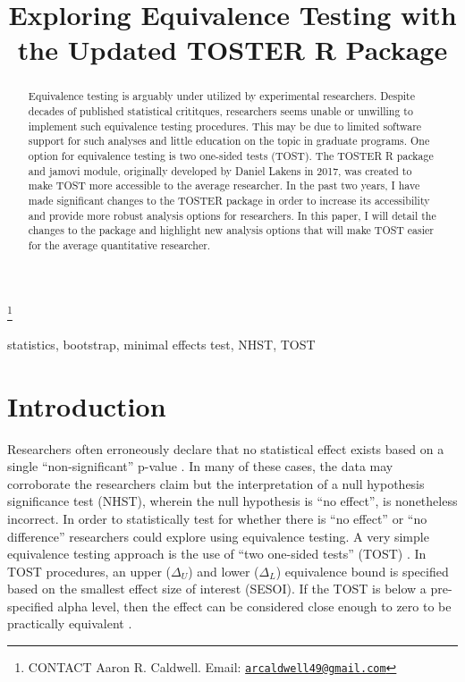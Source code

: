 \documentclass[]{interact}
\theoremstyle{plain}%
\theoremstyle{definition}
\theoremstyle{remark}
\begin{document}

\title{Exploring Equivalence Testing with the Updated TOSTER R Package}


\author{
}

\thanks{CONTACT Aaron R.
Caldwell. Email: \href{mailto:arcaldwell49@gmail.com}{\nolinkurl{arcaldwell49@gmail.com}}}

\maketitle

\begin{abstract}
Equivalence testing is arguably under utilized by experimental
researchers. Despite decades of published statistical crititques,
researchers seems unable or unwilling to implement such equivalence
testing procedures. This may be due to limited software support for such
analyses and little education on the topic in graduate programs. One
option for equivalence testing is two one-sided tests (TOST). The TOSTER
R package and jamovi module, originally developed by Daniel Lakens in
2017, was created to make TOST more accessible to the average
researcher. In the past two years, I have made significant changes to
the TOSTER package in order to increase its accessibility and provide
more robust analysis options for researchers. In this paper, I will
detail the changes to the package and highlight new analysis options
that will make TOST easier for the average quantitative researcher.
\end{abstract}

\begin{keywords}
statistics, bootstrap, minimal effects test, NHST, TOST
\end{keywords}

\hypertarget{introduction}{%
\section{Introduction}\label{introduction}}

Researchers often erroneously declare that no statistical effect exists
based on a single ``non-significant'' p-value \citep{blandaltman95}. In
many of these cases, the data may corroborate the researchers claim but
the interpretation of a null hypothesis significance test (NHST),
wherein the null hypothesis is ``no effect'', is nonetheless incorrect.
In order to statistically test for whether there is ``no effect'' or
``no difference'' researchers could explore using equivalence testing. A
very simple equivalence testing approach is the use of ``two one-sided
tests'' (TOST) \citep{schuirmann1987}. In TOST procedures, an upper
(\(\Delta_U\)) and lower (\(\Delta_L\)) equivalence bound is specified
based on the smallest effect size of interest (SESOI). If the TOST is
below a pre-specified alpha level, then the effect can be considered
close enough to zero to be practically equivalent \citep{lakens_ori}.
\end{document}
